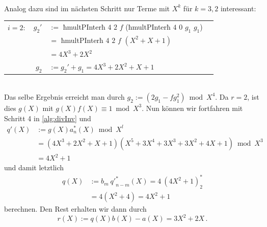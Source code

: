 \begin{beispiel}
\begin{tabular}{lrll}
  \end{tabular}\\
  Analog dazu sind im nächsten Schritt nur Terme mit $X^k$ für 
  $k=3,2$ interessant:\\
  \begin{tabular}{lrll}
    $i=2:$ & $g_2'$&$:=$ ħmultPInterħ $4$ $2$ $f$ (ħmultPInterħ $4$ $0$ $g_1$ $g_1$)\\
            &&$=$ ħmultPInterħ $4$ $2$ $f$ $(X^2+X+1)$\\
            &&$= 4X^3+2X^2$\\
        & $g_2$&$:= g_2' + g_1 = 4X^3+2X^2+X+1$
  \end{tabular}\\
  Das selbe Ergebnis erreicht man durch $g_2 := (2g_1 - fg_1^2) \bmod X^4$.
  Da $r=2$, ist dies $g(X)$ mit $g(X)f(X) \equiv 1 \bmod X^3$.
  Nun können wir fortfahren mit Schritt 4 in \autoref{alg:divInv} und 
  \begin{align*}
    q'(X) &:= g(X) a^\ast_n(X) \bmod X^l\\
    &= (4X^3+2X^2+X+1)(X^5+3X^4+3X^3 + 3X^2 + 4X + 1) \bmod X^3\\
    &= 4X^2 + 1
  \end{align*}
  und damit letztlich
  \begin{align*}
    q(X) &:= b_m\ {q'}^\ast_{n-m}(X) = 4\ (4X^2+1)^\ast_{2} \\
    &= 4 (X^2 + 4) = 4X^2 + 1
  \end{align*}
  berechnen. Den Rest erhalten wir dann durch 
  \[ r(X) := q(X)b(X) - a(X) = 3X^2 + 2X\,. \]
\end{beispiel}


